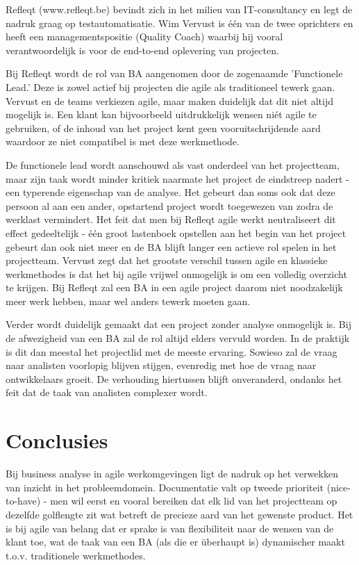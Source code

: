 \documentclass{hogent-article}
\begin{document}
\vspace{5pt}

Refleqt (www.refleqt.be) bevindt zich in het milieu van IT-consultancy en legt de nadruk graag op testautomatisatie. Wim Vervust is één van de twee
oprichters en heeft een managementspositie (Quality Coach) waarbij hij vooral verantwoordelijk is voor de end-to-end oplevering van projecten.

Bij Refleqt wordt de rol van BA aangenomen door de zogenaamde 'Functionele Lead.' Deze is zowel actief bij projecten die agile als traditioneel
tewerk gaan. Vervust en de teams verkiezen agile, maar maken duidelijk dat dit niet altijd mogelijk is. Een klant kan bijvoorbeeld uitdrukkelijk wensen niét agile 
te gebruiken, of de inhoud van het project kent geen vooruitschrijdende aard waardoor ze niet compatibel is met deze werkmethode.

De functionele lead wordt aanschouwd als vast onderdeel van het projectteam, maar zijn taak wordt minder kritiek naarmate het project de eindstreep nadert - een typerende
eigenschap van de analyse. Het gebeurt dan soms ook dat deze persoon al aan een ander, opstartend project wordt toegewezen van zodra de werklast vermindert. Het feit dat men bij Refleqt agile 
werkt neutraliseert dit effect gedeeltelijk - één groot lastenboek opstellen aan het begin van het project gebeurt dan ook niet meer en de BA blijft langer  een
actieve rol spelen in het projectteam. Vervust zegt dat het grootste verschil tussen agile en klassieke werkmethodes is dat het bij agile vrijwel onmogelijk
is om een volledig overzicht te krijgen. Bij Refleqt zal een BA in een agile project daarom niet noodzakelijk meer werk hebben, maar wel anders tewerk moeten gaan.

Verder wordt duidelijk gemaakt dat een project zonder analyse onmogelijk is. Bij de afwezigheid van een BA zal de rol altijd elders vervuld worden. In de praktijk
is dit dan meestal het projectlid met de meeste ervaring. Sowieso zal de vraag naar analisten voorlopig blijven stijgen, evenredig met hoe de vraag naar ontwikkelaars 
groeit. De verhouding hiertussen blijft onveranderd, ondanks het feit dat de taak van analisten complexer wordt.

\section{Conclusies}

Bij business analyse in agile werkomgevingen ligt de nadruk op het verwekken van inzicht in het probleemdomein. Documentatie valt
op tweede prioriteit (nice-to-have) - men wil eerst en vooral bereiken dat elk lid van het projectteam op dezelfde golflengte zit wat betreft de 
precieze aard van het gewenste product. Het is bij agile van belang dat er sprake is van flexibiliteit naar de wensen van de klant toe, wat de taak van een BA
(als die er überhaupt is) dynamischer maakt t.o.v. traditionele werkmethodes.
\end{document}
